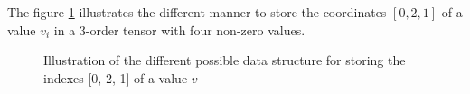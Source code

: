The figure \ref{fig:datastoring} illustrates the different manner to store the coordinates $[0, 2, 1]$ of a value $v_{i}$ in a 3-order tensor with four non-zero values.

\begin{figure}[h]
	\centering
	\quad
	\quad
	\hfill
	\caption{Illustration of the different possible data structure for storing the indexes  [0, 2, 1] of a value $v$ }
	\label{fig:datastoring}
\end{figure}


